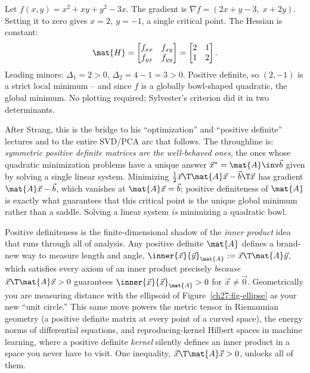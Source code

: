 \begin{example}
\label{ch27:ex-hessian}
Let $f(x,y) = x^2 + xy + y^2 - 3x$. The gradient is $\nabla f = (2x + y - 3,\; x + 2y)$. Setting it
to zero gives $x=2,\ y=-1$, a single critical point. The Hessian is constant:
\[
  \mat{H} = \begin{bmatrix} f_{xx} & f_{xy} \\ f_{yx} & f_{yy} \end{bmatrix}
  = \begin{bmatrix} 2 & 1 \\ 1 & 2 \end{bmatrix}.
\]
Leading minors: $\Delta_1 = 2 > 0$, $\Delta_2 = 4-1 = 3 > 0$. Positive definite, so $(2,-1)$ is a
strict local minimum -- and since $f$ is a globally bowl-shaped quadratic, the global minimum. No
plotting required; Sylvester's criterion did it in two determinants.
\end{example}

\begin{strangbox}
After Strang, this is the bridge to his ``optimization'' and ``positive definite'' lectures and to
the entire SVD/PCA arc that follows. The throughline is: \emph{symmetric positive definite matrices
are the well-behaved ones}, the ones whose quadratic minimization problems have a unique answer
$\vec{x}^* = \mat{A}\inv\vec{b}$ given by solving a single linear system. Minimizing
$\tfrac12\vec{x}\T\mat{A}\vec{x} - \vec{b}\T\vec{x}$ has gradient $\mat{A}\vec{x}-\vec{b}$, which
vanishes at $\mat{A}\vec{x}=\vec{b}$; positive definiteness of $\mat{A}$ is exactly what guarantees
that this critical point is the unique global minimum rather than a saddle. Solving a linear system
\emph{is} minimizing a quadratic bowl.
\end{strangbox}

\begin{connectionbox}
Positive definiteness is the finite-dimensional shadow of the \emph{inner product} idea that runs
through all of analysis. Any positive definite $\mat{A}$ defines a brand-new way to measure length
and angle, $\inner{\vec{x}}{\vec{y}}_{\mat{A}} := \vec{x}\T\mat{A}\vec{y}$, which satisfies every
axiom of an inner product precisely \emph{because} $\vec{x}\T\mat{A}\vec{x}>0$ guarantees
$\inner{\vec{x}}{\vec{x}}_{\mat{A}}>0$ for $\vec{x}\neq\vec{0}$. Geometrically you are measuring
distance with the ellipsoid of Figure~\ref{ch27:fig-ellipse} as your new ``unit circle.'' This same
move powers the metric tensor in Riemannian geometry (a positive definite matrix at every point of a
curved space), the energy norms of differential equations, and reproducing-kernel Hilbert spaces in
machine learning, where a positive definite \emph{kernel} silently defines an inner product in a
space you never have to visit. One inequality, $\vec{x}\T\mat{A}\vec{x}>0$, unlocks all of them.
\end{connectionbox}

